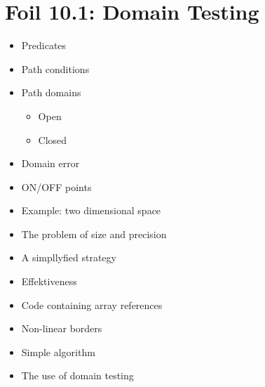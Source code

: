 	\section{Foil 10.1: Domain Testing}
		\begin{itemize}
			\item Predicates
			\item Path conditions
			\item Path domains
				\begin{itemize}
					\item Open
					\item Closed
				\end{itemize}
			\item Domain error
			\item ON/OFF points
			\item Example: two dimensional space
			\item The problem of size and precision
			\item A simpllyfied strategy
			\item Effektiveness
			\item Code containing array references
			\item Non-linear borders
			\item Simple algorithm
			\item The use of domain testing
		\end{itemize}

